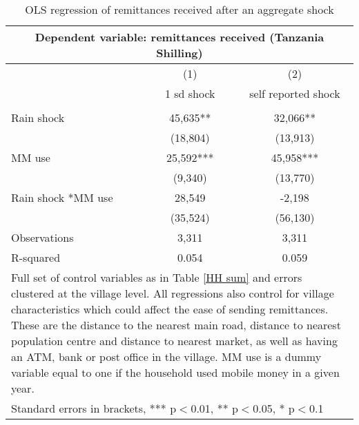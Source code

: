 \begin{table}
\centering 
\caption{OLS regression of remittances received after an aggregate shock} \label{remittance}
\begin{tabular}{lcc}
\multicolumn{3}{c}{Dependent variable: remittances received (Tanzania Shilling)} \\ \hline
 & (1) & (2)  \\
  & 1 sd shock & self reported shock \\ \hline
  &  &   \\
Rain shock & 45,635**& 32,066** \\
   & (18,804) & (13,913) \\
MM use & 25,592*** & 45,958*** \\
  & (9,340) & (13,770) \\
Rain shock *MM use & 28,549 & -2,198 \\
 & (35,524) &   (56,130) \\
Observations & 3,311 & 3,311  \\
R-squared & 0.054 & 0.059 \\ \hline
\multicolumn{3}{p{11cm}}{Full set of control variables as in Table \ref{HH sum} and errors clustered at the village level. All regressions also control for village characteristics which could affect the ease of sending remittances. These are the distance to the nearest main road, distance to nearest population centre and distance to nearest market, as well as having an ATM, bank or post office in the village. MM use is a dummy variable equal to one if the household used mobile money in a given year.} \\
\multicolumn{3}{l}{ Standard errors in brackets, *** p$<$0.01, ** p$<$0.05, * p$<$0.1} \\
\end{tabular}
\end{table}